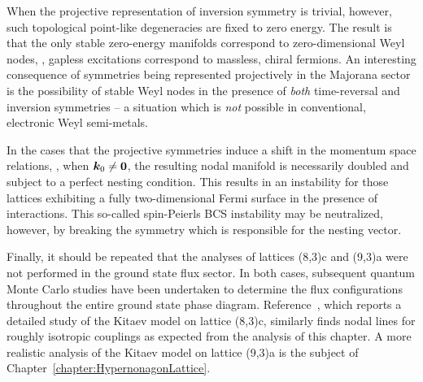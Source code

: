 When the projective representation of inversion symmetry is trivial, however, such topological point-like degeneracies are fixed to zero energy.
The result is that the only stable zero-energy manifolds correspond to zero-dimensional Weyl nodes, \ie, gapless excitations correspond to massless, chiral fermions.
An interesting consequence of symmetries being represented projectively in the Majorana sector is the possibility of stable Weyl nodes in the presence of \textit{both} time-reversal and inversion symmetries -- a situation which is \textit{not} possible in conventional, electronic Weyl semi-metals.

In the cases that the projective symmetries induce a shift in the momentum space relations, \eg, when $\bm{k}_0 \neq \bm{0}$, the resulting nodal manifold is necessarily doubled and subject to a perfect nesting condition.
This results in an instability for those lattices exhibiting a fully two-dimensional Fermi surface in the presence of interactions.
This so-called spin-Peierls BCS instability may be neutralized, however, by breaking the symmetry which is responsible for the nesting vector.

Finally, it should be repeated that the analyses of lattices (8,3)c and (9,3)a were not performed in the ground state flux sector.
In both cases, subsequent quantum Monte Carlo studies have been undertaken to determine the flux configurations throughout the entire ground state phase diagram.
Reference~\cite{EschmannPRL2019}, which reports a detailed study of the Kitaev model on lattice (8,3)c, similarly finds nodal lines for roughly isotropic couplings as expected from the analysis of this chapter.
A more realistic analysis of the Kitaev model on lattice (9,3)a is the subject of Chapter~\ref{chapter:HypernonagonLattice}.